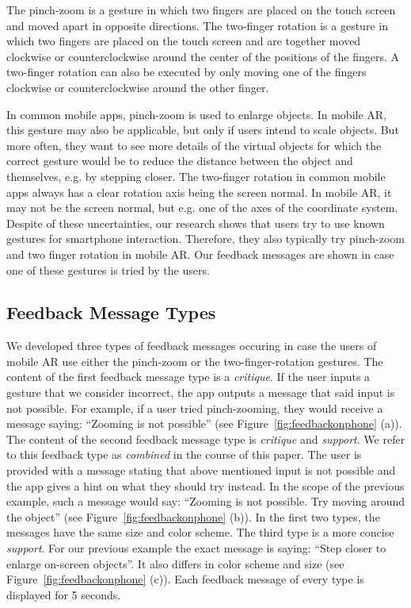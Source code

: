 \documentclass[manuscript]{acmart}
\begin{document}
		The pinch-zoom is a gesture in which two fingers are placed on the touch screen and moved apart in opposite directions. The two-finger rotation is a gesture in which two fingers are placed on the touch screen and are together moved clockwise or counterclockwise around the center of the positions of the fingers. A two-finger rotation can also be executed by only moving one of the fingers clockwise or counterclockwise around the other finger.

		In common mobile apps, pinch-zoom is used to enlarge objects. In mobile \ac{AR}, this gesture may also be applicable, but only if users intend to scale objects. But more often, they want to see more details of the virtual objects for which the correct gesture would be to reduce the distance between the object and themselves, e.g. by stepping closer. The two-finger rotation in common mobile apps always has a clear rotation axis being the screen normal. In mobile \ac{AR}, it may not be the screen normal, but e.g. one of the axes of the coordinate system. Despite of these uncertainties, our research shows that users try to use known gestures for smartphone interaction. Therefore, they also typically try pinch-zoom and two finger rotation in mobile \ac{AR}. Our feedback messages are shown in case one of these gestures is tried by the users.

		\subsection{Feedback Message Types}\label{ssec:feedbackmsgs}
		We developed three types of feedback messages occuring in case the users of mobile AR use either the pinch-zoom or the two-finger-rotation gestures. The content of the first feedback message type is a \emph{critique}. If the user inputs a gesture that we consider incorrect, the app outputs a message that said input is not possible. For example, if a user tried pinch-zooming, they would receive a message saying: ``Zooming is not possible'' (see Figure~\ref{fig:feedbackonphone} (a)). The content of the second feedback message type is \emph{critique} and \emph{support}. We refer to this feedback type as \emph{combined} in the course of this paper. The user is provided with a message stating that above mentioned input is not possible and the app gives a hint on what they should try instead. In the scope of the previous example, such a message would say: ``Zooming is not possible. Try moving around the object'' (see Figure~\ref{fig:feedbackonphone} (b)). In the first two types, the messages have the same size and color scheme. The third type is a more concise \emph{support}. For our previous example the exact message is saying: ``Step closer to enlarge on-screen objects''. It also differs in color scheme and size (see Figure~\ref{fig:feedbackonphone} (c)). Each feedback message of every type is displayed for 5 seconds.
\end{document}
